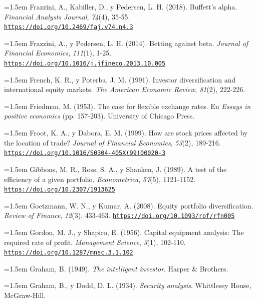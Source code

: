 \documentclass[10pt,a4paper]{article}
\begin{document}
\noindent\hangindent=1.5em Frazzini, A., Kabiller, D., y Pedersen, L. H. (2018). Buffett's alpha. \textit{Financial Analysts Journal}, \textit{74}(4), 35-55. \href{https://doi.org/10.2469/faj.v74.n4.3}{\nolinkurl{https://doi.org/10.2469/faj.v74.n4.3}}

\noindent\hangindent=1.5em Frazzini, A., y Pedersen, L. H. (2014). Betting against beta. \textit{Journal of Financial Economics}, \textit{111}(1), 1-25. \href{https://doi.org/10.1016/j.jfineco.2013.10.005}{\nolinkurl{https://doi.org/10.1016/j.jfineco.2013.10.005}}

\noindent\hangindent=1.5em French, K. R., y Poterba, J. M. (1991). Investor diversification and international equity markets. \textit{The American Economic Review}, \textit{81}(2), 222-226.

\noindent\hangindent=1.5em Friedman, M. (1953). The case for flexible exchange rates. En \textit{Essays in positive economics} (pp. 157-203). University of Chicago Press.

\noindent\hangindent=1.5em Froot, K. A., y Dabora, E. M. (1999). How are stock prices affected by the location of trade? \textit{Journal of Financial Economics}, \textit{53}(2), 189-216. \href{https://doi.org/10.1016/S0304-405X(99)00020-3}{\nolinkurl{https://doi.org/10.1016/S0304-405X(99)00020-3}}

\noindent\hangindent=1.5em Gibbons, M. R., Ross, S. A., y Shanken, J. (1989). A test of the efficiency of a given portfolio. \textit{Econometrica}, \textit{57}(5), 1121-1152. \href{https://doi.org/10.2307/1913625}{\nolinkurl{https://doi.org/10.2307/1913625}}

\noindent\hangindent=1.5em Goetzmann, W. N., y Kumar, A. (2008). Equity portfolio diversification. \textit{Review of Finance}, \textit{12}(3), 433-463. \href{https://doi.org/10.1093/rof/rfn005}{\nolinkurl{https://doi.org/10.1093/rof/rfn005}}

\noindent\hangindent=1.5em Gordon, M. J., y Shapiro, E. (1956). Capital equipment analysis: The required rate of profit. \textit{Management Science}, \textit{3}(1), 102-110. \href{https://doi.org/10.1287/mnsc.3.1.102}{\nolinkurl{https://doi.org/10.1287/mnsc.3.1.102}}

\noindent\hangindent=1.5em Graham, B. (1949). \textit{The intelligent investor}. Harper \& Brothers.

\noindent\hangindent=1.5em Graham, B., y Dodd, D. L. (1934). \textit{Security analysis}. Whittlesey House, McGraw-Hill.
\end{document}
